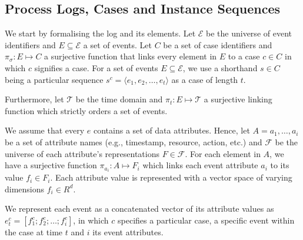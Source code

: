 \documentclass[./../../paper.tex]{subfiles}
\begin{document}
\subsection{Process Logs, Cases and Instance Sequences}


We start by formalising the log and its elements. Let $\mathcal{E}$ be the universe of event identifiers and $E \subseteq \mathcal{E}$ a set of events. Let $C$ be a set of case identifiers and $\pi_\sigma : E \mapsto C$ a surjective function that links every element in $E$ to a case $c \in C$ in which $c$ signifies a case. For a set of events $E \subseteq \mathcal{E}$, we use a shorthand $s \in C$ being a particular sequence $s^{c} = \langle e_1, e_2, \ldots, e_t \rangle$ as a case of length $t$. 

Furthermore, let $\mathcal{T}$ be the time domain and $\pi_t : E \mapsto \mathcal{T}$ a surjective linking function which strictly orders a set of events.

We assume that every $e$ contains a set of data attributes. Hence, let $A = a_1, \ldots, a_i$ be a set of attribute names (e.g., timestamp, resource, action, etc.) and $\mathcal{F}$ be the universe of each attribute's representations $F \in \mathcal{F}$. For each element in $A$, we have a surjective function $\pi_{a_i} : A \mapsto F_i$ which links each event attribute $a_i$ to its value $f_i \in F_i$. Each attribute value is represented with a vector space of varying dimensions $f_i \in R^d$.  

We represent each event as a concatenated vector of its attribute values as $e_t^{c} = [f_1^{c}; f_2^{c}; \ldots; f_i^{c}]$, in which $c$ specifies a particular case, a specific event within the case at time $t$ and $i$ its event attributes. 
\end{document}

